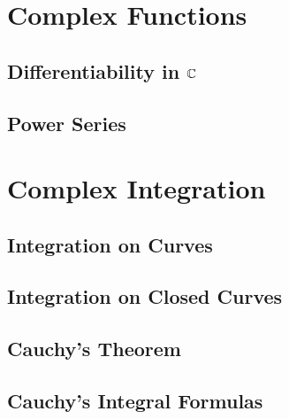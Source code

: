 \documentclass[oneside]{memoir}
\begin{document}
\chapter{Complex Functions}
\label{cha:complex_functions}



\section{Differentiability in \(\mathbb{C}\)}
\label{sec:differentiability_in_c}

	


\section{Power Series}
\label{sec:power_series}




\chapter{Complex Integration}
\label{cha:complex_integration}

\section{Integration on Curves}
\label{sec:integration_on_curves}



\section{Integration on Closed Curves}
\label{sec:integration_on_closed_curves}



\section{Cauchy's Theorem}
\label{sec:cauchy_s_theorem}





\section{Cauchy's Integral Formulas}
\label{sec:cauchy_s_integral_formulas}
\end{document}
